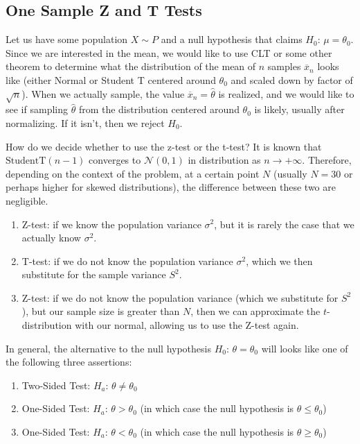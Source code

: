 \subsection{One Sample Z and T Tests}

  Let us have some population $X \sim P$ and a null hypothesis that claims $H_0 : \, \mu = \theta_0$. Since we are interested in the mean, we would like to use CLT or some other theorem to determine what the distribution of the mean of $n$ samples $\overline{x}_n$ looks like (either Normal or Student T centered around $\theta_0$ and scaled down by factor of $\sqrt{n}$). When we actually sample, the value $\overline{x}_n = \hat{\theta}$ is realized, and we would like to see if sampling $\hat{\theta}$ from the distribution centered around $\theta_0$ is likely, usually after normalizing. If it isn't, then we reject $H_0$. 

  How do we decide whether to use the z-test or the t-test? It is known that $\mathrm{StudentT}(n-1)$ converges to $\mathcal{N}(0, 1)$ in distribution as $n \rightarrow +\infty$. Therefore, depending on the context of the problem, at a certain point $N$ (usually $N = 30$ or perhaps higher for skewed distributions), the difference between these two are negligible. 
  \begin{enumerate}
    \item Z-test: if we know the population variance $\sigma^2$, but it is rarely the case that we actually know $\sigma^2$. 
    \item T-test: if we do not know the population variance $\sigma^2$, which we then substitute for the sample variance $S^2$. 
    \item Z-test: if we do not know the population variance (which we substitute for $S^2$), but our sample size is greater than $N$, then we can approximate the $t$-distribution with our normal, allowing us to use the Z-test again. 
  \end{enumerate}

  In general, the alternative to the null hypothesis $H_0 : \, \theta = \theta_0$ will looks like one of the following three assertions: 
  \begin{enumerate}
    \item Two-Sided Test: $H_a : \, \theta \neq \theta_0$ 
    \item One-Sided Test: $H_a : \, \theta > \theta_0$ (in which case the null hypothesis is $\theta \leq \theta_0$) 
    \item One-Sided Test: $H_a : \, \theta < \theta_0$ (in which case the null hypothesis is $\theta \geq \theta_0$) 
  \end{enumerate}

